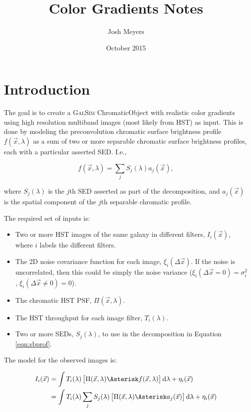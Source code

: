 \documentclass{article}
\title{Color Gradients Notes}
\author{Josh Meyers}
\date{October 2015}
\begin{document}
\section{Introduction}

The goal is to create a \textsc{GalSim} ChromaticObject with realistic color gradients using high
resolution multiband images (most likely from HST) as input.  This is done by modeling the
preconvolution chromatic surface brightness profile $f(\vec{x}, \lambda)$ as a sum of two or more
separable chromatic surface brightness profiles, each with a particular asserted SED.  I.e.,

\begin{equation}
    \label{eqn:sbprof}
    f(\vec{x}, \lambda) = \sum_j S_j(\lambda) a_j(\vec{x}),
\end{equation}

where $S_j(\lambda)$ is the $j$th SED asserted as part of the decomposition, and $a_j(\vec{x})$ is
the spatial component of the $j$th separable chromatic profile.

The required set of inputs is:

\begin{itemize}

\item Two or more HST images of the same galaxy in different filters, $I_i(\vec{x})$, where $i$
labels the different filters.

\item The 2D noise covariance function for each image, $\xi_i(\Delta\vec{x})$.  If the noise is
uncorrelated, then this could be simply the noise variance ($\xi_i(\Delta\vec{x}=0) = \sigma^2_i$, $\xi_i(\Delta\vec{x}\ne0)=0$).

\item The chromatic HST PSF, $\Pi(\vec{x}, \lambda)$.

\item The HST throughput for each image filter, $T_i(\lambda)$.

\item Two or more SEDs, $S_j(\lambda)$, to use in the decomposition in Equation \ref{eqn:sbprof}.

\end{itemize}

The model for the observed images is:

\begin{align}
    I_i(\vec{x})
    &= \int T_i(\lambda) \left[\Pi(\vec{x}, \lambda) \Asterisk f(\vec{x}, \lambda)\right] \dif{\lambda} + \eta_i(\vec{x}) \\
    &= \int T_i(\lambda) \sum_j S_j(\lambda) \left[\Pi(\vec{x}, \lambda) \Asterisk a_j(\vec{x})\right] \dif{\lambda} + \eta_i(\vec{x})
\end{align}
\end{document}
